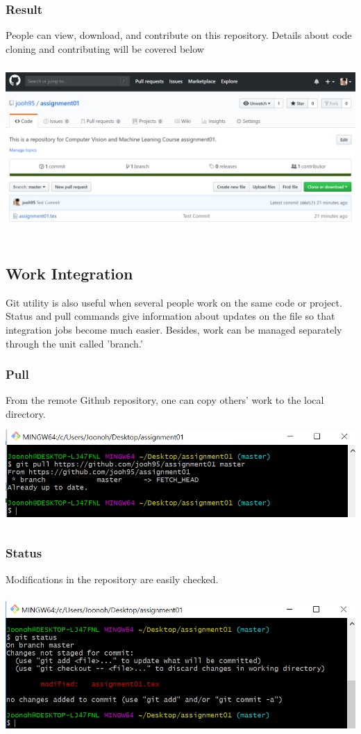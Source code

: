 \documentclass[18pt]{article}%
\begin{document}
\subsubsection {Result}
People can view, download, and contribute on this repository. Details about code cloning and contributing will be covered below\\
\includegraphics[height=7cm]{upload.PNG}


\subsection {Work Integration}
Git utility is also useful when several people work on the same code or project. Status and pull commands give information about updates on the file so that integration jobs become much easier. Besides, work can be managed separately through the unit called 'branch.'


\subsubsection {Pull}
From the remote Github repository, one can copy others' work to the local directory.\\
\includegraphics[height=4cm]{pull.PNG}

\subsubsection {Status}
Modifications in the repository are easily checked.\\
\includegraphics[height=6cm]{status.PNG}
\end{document}
